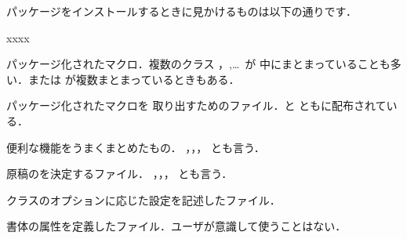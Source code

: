 {{{{{パッケージをインストールするときに見かけるものは以下の通りです．
\begin{namelist}{xxxx}
%
\item[\Exten{dtx}] パッケージ化されたマクロ．複数のクラス
，,\ldots\, が
中にまとまっていることも多い．または
が複数まとまっているときもある．
\item[\Exten{ins}] パッケージ化されたマクロを
    取り出すためのファイル．と
    ともに配布されている．
\item[\Exten{sty}] 便利な機能をうまくまとめたもの．
    ，，，
    とも言う．
\item[\Exten{cls}] 
%
%
%
%
%
  原稿のを決定するファイル．
  ，，，%
  とも言う．
\item[\Exten{clo}] 
  クラスのオプションに応じた設定を記述したファイル．
\item[\Exten{fd}]  
  書体の属性を定義したファイル．ユーザが意識して使うことはない．
\end{namelist}

}}}}}
